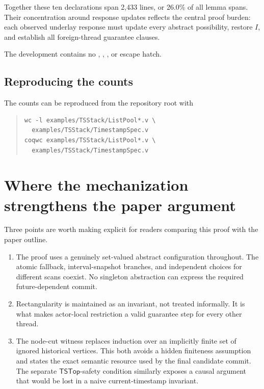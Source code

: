 \documentclass[11pt]{article}
\theoremstyle{definition}
\theoremstyle{remark}
\newcommand{\topts}{\mathsf{TSTop}}
\newcommand{\code}[1]{\texttt{\detokenize{#1}}}
\begin{document}
Together these ten declarations span 2,433 lines, or 26.0\% of all lemma
spans.  Their concentration around response updates reflects the central proof
burden: each observed underlay response must update every abstract possibility,
restore \(I\), and establish all foreign-thread guarantee clauses.

The development contains no \code{Admitted}, \code{admit}, \code{Axiom}, or
\code{Abort} escape hatch.

\subsection{Reproducing the counts}

The counts can be reproduced from the repository root with
\begin{quote}
\small
\begin{verbatim}
wc -l examples/TSStack/ListPool*.v \
  examples/TSStack/TimestampSpec.v
coqwc examples/TSStack/ListPool*.v \
  examples/TSStack/TimestampSpec.v
\end{verbatim}
\end{quote}

\section{Where the mechanization strengthens the paper argument}

Three points are worth making explicit for readers comparing this proof with
the paper outline.

\begin{enumerate}
\item The proof uses a genuinely set-valued abstract configuration throughout.
The atomic fallback, interval-snapshot branches, and independent choices for
different scans coexist.  No singleton abstraction can express the required
future-dependent commit.

\item Rectangularity is maintained as an invariant, not treated informally.
It is what makes actor-local restriction a valid guarantee step for every
other thread.

\item The node-cut witness replaces induction over an implicitly finite set of
ignored historical vertices.  This both avoids a hidden finiteness assumption
and states the exact semantic resource used by the final candidate commit.
The separate \(\topts\)-safety condition similarly exposes a causal argument
that would be lost in a naive current-timestamp invariant.
\end{enumerate}
\end{document}
